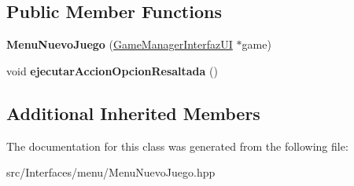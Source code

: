 \subsection*{Public Member Functions}
\begin{DoxyCompactItemize}
\item 
{\bfseries Menu\+Nuevo\+Juego} (\hyperlink{class_game_manager_interfaz_u_i}{Game\+Manager\+Interfaz\+UI} $\ast$game)\hypertarget{class_menu_nuevo_juego_aadb15d1ac9e2ba945802379dd31a4e60}{}\label{class_menu_nuevo_juego_aadb15d1ac9e2ba945802379dd31a4e60}

\item 
void {\bfseries ejecutar\+Accion\+Opcion\+Resaltada} ()\hypertarget{class_menu_nuevo_juego_a2f90015753cd1e839a5cf5e418b28277}{}\label{class_menu_nuevo_juego_a2f90015753cd1e839a5cf5e418b28277}

\end{DoxyCompactItemize}
\subsection*{Additional Inherited Members}


The documentation for this class was generated from the following file\+:\begin{DoxyCompactItemize}
\item 
src/\+Interfaces/menu/Menu\+Nuevo\+Juego.\+hpp\end{DoxyCompactItemize}
